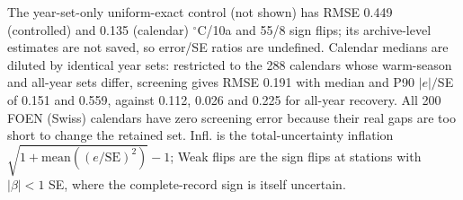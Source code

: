 \begin{table}[t]
\centering
\small
\caption{Archive-level H30 slope error scaled by the station's classical OLS slope standard error. Controlled: 30--90-day gaps; Calendar: empirical gap calendars. RMSE is in $^{\circ}$C/10a. $e$ is the estimated minus the complete-record slope.}
\label{tab:trend_signal_cohorts}
\par\smallskip\footnotesize The year-set-only uniform-exact control (not shown) has RMSE 0.449 (controlled) and 0.135 (calendar) $^{\circ}$C/10a and 55/8 sign flips; its archive-level estimates are not saved, so error/SE ratios are undefined. Calendar medians are diluted by identical year sets: restricted to the 288 calendars whose warm-season and all-year sets differ, screening gives RMSE 0.191 with median and P90 $|e|/$SE of 0.151 and 0.559, against 0.112, 0.026 and 0.225 for all-year recovery. All 200 FOEN (Swiss) calendars have zero screening error because their real gaps are too short to change the retained set. Infl. is the total-uncertainty inflation $\sqrt{1+\mathrm{mean}((e/\mathrm{SE})^2)}-1$; Weak flips are the sign flips at stations with $|\beta|<1$ SE, where the complete-record sign is itself uncertain.
\end{table}

